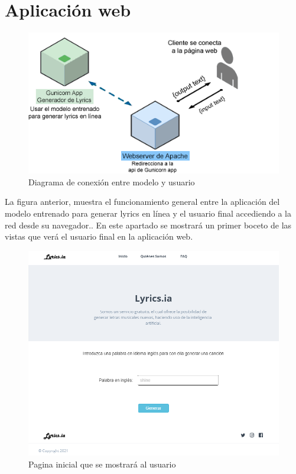 \documentclass[12pt, a4paper, titlepage]{report}
\begin{document}
\section{Aplicación web}
\begin{figure}[H] 
	\includegraphics[scale=.75]{./imagenes/Disenio/Arquitectura/Usuario_modelo.png}
	\caption{Diagrama de conexión entre modelo y usuario}
\end{figure}
La figura anterior, muestra el funcionamiento general entre la aplicación del modelo entrenado para generar lyrics en línea y el usuario final accediendo a la red desde su navegador..
En este apartado se mostrará un primer boceto de las vistas que verá el usuario final en la aplicación web.	        
\begin{figure}[H] 
	\includegraphics[width=12cm]{./imagenes/Analisis/MockFront.png}
	\centering 
	\caption{Pagina inicial que se mostrará al usuario}
\end{figure}
\end{document}

